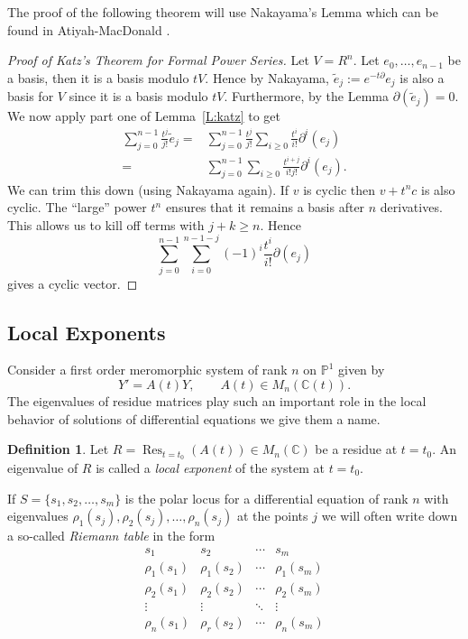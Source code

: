 \documentclass[12pt]{book}
\numberwithin{equation}{section}
\theoremstyle{definition}
\newtheorem{definition}[theorem]{Definition}
\theoremstyle{remark}
\newcommand{\CC}{\mathbb{C}}
\newcommand{\PP}{\mathbb{P}}
\newcommand{\Res}{\operatorname{Res}}
\begin{document}
The proof of the following theorem will use Nakayama's Lemma which can be found in Atiyah-MacDonald \cite[pg 21]{Atiyah2016}.
\begin{proof}[Proof of Katz's Theorem for Formal Power Series]
	Let $V = R^n$. 
	Let $e_0,\ldots,e_{n-1}$ be a basis, then it is a basis modulo $tV$. 
	Hence by Nakayama, $\widetilde{e}_j:=e^{-t\partial }e_j$ is also a basis for $V$ since it is a basis modulo $tV$. 
	Furthermore, by the Lemma $\partial(\widetilde{e}_j)=0$. 
	We now apply part one of Lemma~\ref{L:katz} to get 
	\begin{align*}
	\sum_{j=0}^{n-1} \frac{t^j}{j!}\widetilde{e}_j =& \sum_{j=0}^{n-1}\frac{t^j}{j!} \sum_{i\geq 0}\frac{t^i}{i!} \partial^i(e_j) \\
	=& \sum_{j=0}^{n-1}\sum_{i\geq 0}\frac{t^{i+j}}{i!j!} \partial^i(e_j).
	\end{align*}
	We can trim this down (using Nakayama again). 
	If $v$ is cyclic then $v+t^n c$ is also cyclic. 
	The ``large'' power $t^n$ ensures that it remains a basis after $n$ derivatives. 
	This allows us to kill off terms with $j+k \geq n$. 
	Hence 
	$$ \sum_{j=0}^{n-1}\sum_{i=0}^{n-1-j}(-1)^i \frac{t^i}{i!}\partial(e_j) $$
	gives a cyclic vector.
\end{proof}

\subsection{Local Exponents}
Consider a first order meromorphic system of rank $n$ on $\PP^1$ given by 
$$ Y' = A(t) Y, \qquad A(t) \in M_n(\CC(t)).$$
The eigenvalues of residue matrices play such an important role in the local behavior of solutions of differential equations we give them a name.
\begin{definition}
	Let $R= \Res_{t=t_0}(A(t)) \in M_n(\CC)$ be a residue at $t=t_0$.
	An eigenvalue of $R$ is called a \emph{local exponent} of the system at $t=t_0$.
\end{definition}
If $S=\lbrace s_1,s_2,\ldots,s_m \rbrace$ is the polar locus for a differential equation of rank $n$ with eigenvalues $\rho_1(s_j),\rho_2(s_j),\ldots, \rho_n(s_j)$ at the points $j$ we will often write down a so-called \emph{Riemann table} in the form
$$\begin{array}{cccc}
	s_1 & s_2 & \cdots & s_m \\
	\hline \hline 
	\rho_1(s_1) & \rho_1(s_2) & \cdots & \rho_1(s_m) \\
	\rho_2(s_1) & \rho_2(s_2) & \cdots & \rho_2(s_m) \\
	\vdots & \vdots & \ddots &\vdots \\
	\rho_n(s_1) & \rho_r(s_2) & \cdots & \rho_n(s_m)
\end{array}$$
\end{document}
